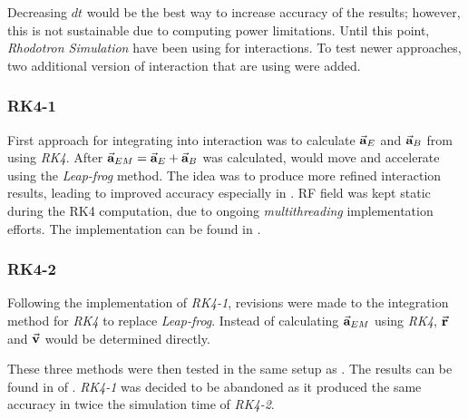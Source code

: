 \documentclass[a4paper,oneside,12pt]{report}
\numberwithin{equation}{chapter}
\begin{document}
Decreasing $dt$ would be the best way to increase accuracy of the results; however, this is not sustainable due to computing power limitations. 
Until this point, \textit{Rhodotron Simulation} have been using  for \eEM interactions. 
To test newer approaches, two additional version of  \eEM interaction that are using  were added.
\subsubsection{RK4-1}
First approach for integrating  into \eEM interaction was to calculate $\vec{\textbf{a}}_{E}$ and $\vec{\textbf{a}}_{B}$ from  using \textit{RK4}.
After $\vec{\textbf{a}}_{EM} = \vec{\textbf{a}}_{E} + \vec{\textbf{a}}_{B}$ was calculated, \e would move and accelerate using the \textit{Leap-frog} method. 
The idea was to produce more refined interaction results, leading to improved accuracy especially in \eB.
RF field was kept static during the RK4 computation, due to ongoing \textit{multithreading} implementation efforts. 
The implementation can be found in .
\subsubsection{RK4-2}
Following the implementation of \textit{RK4-1}, revisions were made to the integration method for \textit{RK4} to replace \textit{Leap-frog}.
Instead of calculating $\vec{\textbf{a}}_{EM}$ using \textit{RK4}, $\vec{\textbf{r}}$ and $\vec{\textbf{v}}$ would be determined directly.

These three methods were then tested in the same setup as . The results can be found in  of .
\textit{RK4-1} was decided to be abandoned as it produced the same accuracy in twice the simulation time of \textit{RK4-2}.
\end{document}
